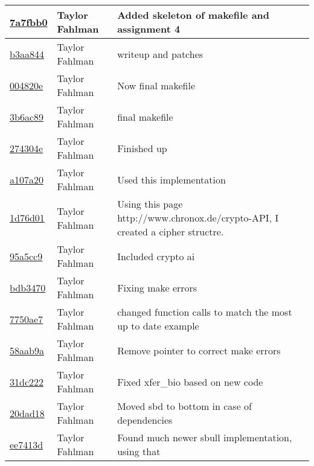 \begin{tabular}{l l l}
\href{https://github.com/fahlmant/cs444/commit/7a7fbb01150699f83b98bfc6807397066766a396}{7a7fbb0} & Taylor Fahlman & Added skeleton of makefile and assignment 4\\\hline
\href{https://github.com/fahlmant/cs444/commit/b3aa8442d161887dfb6a0916a8308e191390ec06}{b3aa844} & Taylor Fahlman & writeup and patches\\\hline
\href{https://github.com/fahlmant/cs444/commit/004820e9120570f2fa0627732e0de21668eaed13}{004820e} & Taylor Fahlman & Now final makefile\\\hline
\href{https://github.com/fahlmant/cs444/commit/3b6ac89e287e3eaca2b3cb1f7aca8094c2c9bf5c}{3b6ac89} & Taylor Fahlman & final makefile\\\hline
\href{https://github.com/fahlmant/cs444/commit/274304e04de3ce8f0b5e485445ff16700a98b0b0}{274304e} & Taylor Fahlman & Finished up\\\hline
\href{https://github.com/fahlmant/cs444/commit/a107a206c3be4de2a7aee2b657ae7a98eb04a68a}{a107a20} & Taylor Fahlman & Used this implementation\\\hline
\href{https://github.com/fahlmant/cs444/commit/1d76d01de43b06dbe9dab7951763ed1848c9e6c8}{1d76d01} & Taylor Fahlman & Using this page http://www.chronox.de/crypto-API, I created a cipher structre.\\\hline
\href{https://github.com/fahlmant/cs444/commit/95a5cc9c095e5a588b9813ad579cc838c5f142f7}{95a5cc9} & Taylor Fahlman & Included crypto ai\\\hline
\href{https://github.com/fahlmant/cs444/commit/bdb34702a8d5df714e0d60f94ad42670a1d9e2a6}{bdb3470} & Taylor Fahlman & Fixing make errors\\\hline
\href{https://github.com/fahlmant/cs444/commit/7750ae7de8401e83a4a038af4ae1db2884a9e71e}{7750ae7} & Taylor Fahlman & changed function calls to match the most up to date example\\\hline
\href{https://github.com/fahlmant/cs444/commit/58aab9ac4d09ff701e74675e4c780d8175c93bad}{58aab9a} & Taylor Fahlman & Remove pointer to correct make errors\\\hline
\href{https://github.com/fahlmant/cs444/commit/31dc2229f379fc0465c67536249135c513a75807}{31dc222} & Taylor Fahlman & Fixed xfer_bio based on new code\\\hline
\href{https://github.com/fahlmant/cs444/commit/20dad183ac4d3f832c3897a2074652a697506bbc}{20dad18} & Taylor Fahlman & Moved sbd to bottom in case of dependencies\\\hline
\href{https://github.com/fahlmant/cs444/commit/ee7413dc03341028540620375482c5a7e72f729c}{ee7413d} & Taylor Fahlman & Found much newer sbull implementation, using that\\\hline

\end{tabular}
